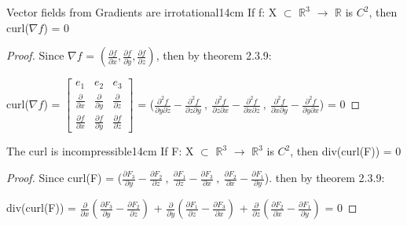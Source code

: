     \vspace{0.5cm}



    \begin{wtheorem}{Vector fields from Gradients are irrotational}{14cm}
        If f: X $\subset$ $\mathbb{R}^3$ $\rightarrow$ $\mathbb{R}$
        is $C^2$, then curl($\nabla f$) = 0
    \end{wtheorem}

    \begin{proof}
        Since $\nabla f$
        = $(\frac{\partial f}{\partial x},
            \frac{\partial f}{\partial y},
            \frac{\partial f}{\partial z})$,
        then by {\color{red} theorem 2.3.9}:

        \hspace{0.5cm}
        curl($\nabla f$) =
        $
        \begin{bmatrix}
            e_1 & e_2 & e_3 \\
            \frac{\partial}{\partial x} & \frac{\partial}{\partial y}
                & \frac{\partial}{\partial z} \\
            \frac{\partial f}{\partial x} & \frac{\partial f}{\partial y}
                & \frac{\partial f}{\partial z}
        \end{bmatrix}
        $
        = ($\frac{\partial^2 f}{\partial y\partial z}
                - \frac{\partial^2 f}{\partial z\partial y} \ , \
            \frac{\partial^2 f}{\partial z\partial x}
                - \frac{\partial^2 f}{\partial x\partial z} \ , \
            \frac{\partial^2 f}{\partial x\partial y}
                - \frac{\partial^2 f}{\partial y\partial x}$)
        = 0
    \end{proof}

    \vspace{0.5cm}



    \begin{wtheorem}{The curl is incompressible}{14cm}
        If F: X $\subset$ $\mathbb{R}^3$ $\rightarrow$ $\mathbb{R}^3$
        is $C^2$, then div(curl(F)) = 0
    \end{wtheorem}

    \begin{proof}
        Since curl(F)
        = ($\frac{\partial F_3}{\partial y}-\frac{\partial F_2}{\partial z} \ , \
            \frac{\partial F_1}{\partial z}-\frac{\partial F_3}{\partial x} \ , \
            \frac{\partial F_2}{\partial x}-\frac{\partial F_1}{\partial y}$).
        then by {\color{red} theorem 2.3.9}:

        \hspace{0.5cm}
        div(curl(F))
        = $\frac{\partial}{\partial x}
            (\frac{\partial F_3}{\partial y}-\frac{\partial F_2}{\partial z})$
            + $\frac{\partial}{\partial y}
            (\frac{\partial F_1}{\partial z}-\frac{\partial F_3}{\partial x})$
            + $\frac{\partial}{\partial z}
            (\frac{\partial F_2}{\partial x}-\frac{\partial F_1}{\partial y})$
        = 0
    \end{proof}

